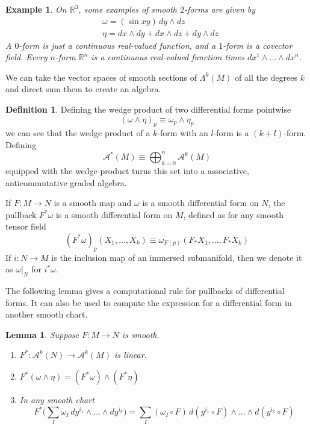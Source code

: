 \documentclass{article}
\newtheorem{lemma}[theorem]{Lemma}
\newtheorem{example}{Example}[section]
\theoremstyle{remark}
\theoremstyle{definition}
\newtheorem{definition}{Definition}[section]
\begin{document}
    \begin{example}
    On $\mathbb{R}^3$, some examples of smooth $2$-forms are given by 
    \begin{align*}
        & \omega = (\sin{xy}) \,dy \wedge dz \\
        & \eta = dx \wedge dy + dx \wedge dz + dy \wedge dz 
    \end{align*}
    A $0$-form is just a continuous real-valued function, and a $1$-form is a covector field. Every $n$-form $\mathbb{R}^n$ is a continuous real-valued function times $dx^1 \wedge ... \wedge dx^n$. 
    \end{example}

    We can take the vector spaces of smooth sections of $\Lambda^k (M)$ of all the degrees $k$ and direct sum them to create an algebra. 

    \begin{definition}
    Defining the wedge product of two differential forms pointwise
    \[(\omega \wedge \eta)_p \equiv \omega_p \wedge \eta_p\]
    we can see that the wedge product of a $k$-form with an $l$-form is a $(k+l)$-form. Defining 
    \[\mathcal{A}^* (M) \equiv \bigoplus_{k=0}^n \mathcal{A}^k (M)\]
    equipped with the wedge product turns this set into a associative, anticommutative graded algebra. 
    \end{definition}

    If $F: M \longrightarrow N$ is a smooth map and $\omega$ is a smooth differential form on $N$, the pullback $F^* \omega$ is a smooth differential form on $M$, defined as for any smooth tensor field 
    \[(F^* \omega)_p (X_1, ..., X_k) \equiv \omega_{F(p)} (F_* X_1, ..., F_* X_k)\]
    If $i: N \longrightarrow M$ is the inclusion map of an immersed submanifold, then we denote it as $\omega \big|_N$ for $i^* \omega$. 

    The following lemma gives a computational rule for pullbacks of differential forms. It can also be used to compute the expression for a differential form in another smooth chart. 
    \begin{lemma}
    Suppose $F: M \longrightarrow N$ is smooth. 
    \begin{enumerate}
        \item $F^*: \mathcal{A}^k (N) \longrightarrow \mathcal{A}^k (M)$ is linear. 
        \item $F^* (\omega \wedge \eta) = (F^* \omega) \wedge (F^* \eta)$
        \item In any smooth chart 
        \[F^* \Big( \sum_I \omega_I \, dy^{i_1} \wedge ... \wedge dy^{i_k} \Big) = \sum_I (\omega_I \circ F) \, d(y^{i_1} \circ F) \wedge ... \wedge d(y^{i_k} \circ F)\]
    \end{enumerate}
    \end{lemma}
\end{document}
